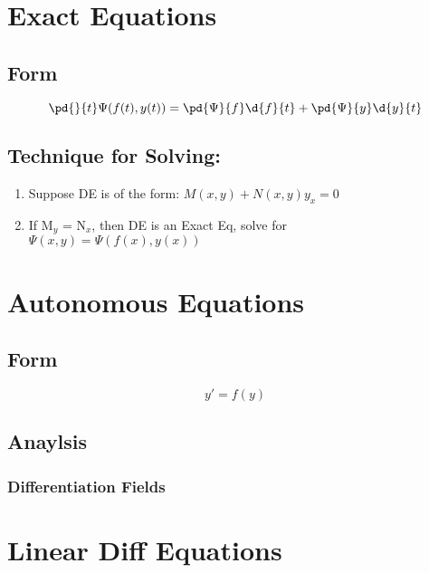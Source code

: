 \documentclass[11pt]{article}
\begin{document}
\section{Exact Equations}
\label{sec-7}

\subsection{Form}
\label{sec-7.1}

   \begin{equation}
   \pd{}{t}\Psi(f(t),y(t)) = \pd{\Psi}{f}\d{f}{t} + \pd{\Psi}{y}\d{y}{t}
   \end{equation}
\subsection{Technique for Solving:}
\label{sec-7.2}

\begin{enumerate}
\item Suppose DE is of the form: $M(x,y) + N(x,y) y_x = 0$
\item If M$_y$ = N$_x$, then DE is an Exact Eq, solve for $\Psi(x,y) = \Psi( f(x), y(x))$
\end{enumerate}
\section{Autonomous Equations}
\label{sec-8}

\subsection{Form}
\label{sec-8.1}

   \begin{equation}
   y'=f(y)
   \end{equation}
\subsection{Anaylsis}
\label{sec-8.2}

\subsubsection{Differentiation Fields}
\label{sec-8.2.1}

\section{Linear Diff Equations}
\label{sec-9}
\end{document}
